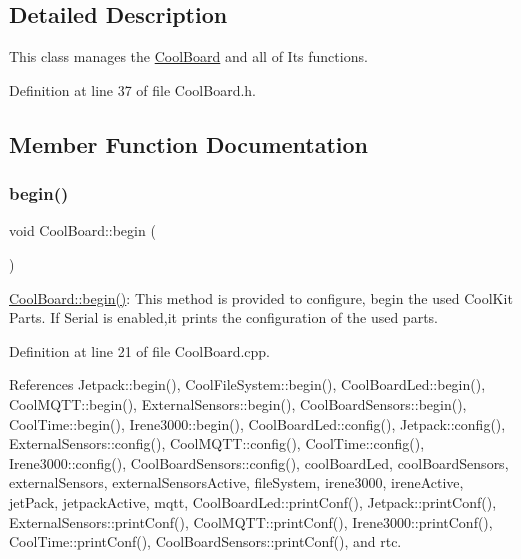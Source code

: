 \subsection{Detailed Description}
This class manages the \hyperlink{classCoolBoard}{Cool\+Board} and all of Its functions. 

Definition at line 37 of file Cool\+Board.\+h.



\subsection{Member Function Documentation}
\mbox{\label{classCoolBoard_acba7c5aef7268b2c0044bdb54d3b9d76}} 
\subsubsection{\texorpdfstring{begin()}{begin()}}
{\footnotesize\ttfamily void Cool\+Board\+::begin (\begin{DoxyParamCaption}{ }\end{DoxyParamCaption})}

\hyperlink{classCoolBoard_acba7c5aef7268b2c0044bdb54d3b9d76}{Cool\+Board\+::begin()}\+: This method is provided to configure, begin the used Cool\+Kit Parts. If Serial is enabled,it prints the configuration of the used parts. 

Definition at line 21 of file Cool\+Board.\+cpp.



References Jetpack\+::begin(), Cool\+File\+System\+::begin(), Cool\+Board\+Led\+::begin(), Cool\+M\+Q\+T\+T\+::begin(), External\+Sensors\+::begin(), Cool\+Board\+Sensors\+::begin(), Cool\+Time\+::begin(), Irene3000\+::begin(), Cool\+Board\+Led\+::config(), Jetpack\+::config(), External\+Sensors\+::config(), Cool\+M\+Q\+T\+T\+::config(), Cool\+Time\+::config(), Irene3000\+::config(), Cool\+Board\+Sensors\+::config(), cool\+Board\+Led, cool\+Board\+Sensors, external\+Sensors, external\+Sensors\+Active, file\+System, irene3000, irene\+Active, jet\+Pack, jetpack\+Active, mqtt, Cool\+Board\+Led\+::print\+Conf(), Jetpack\+::print\+Conf(), External\+Sensors\+::print\+Conf(), Cool\+M\+Q\+T\+T\+::print\+Conf(), Irene3000\+::print\+Conf(), Cool\+Time\+::print\+Conf(), Cool\+Board\+Sensors\+::print\+Conf(), and rtc.


